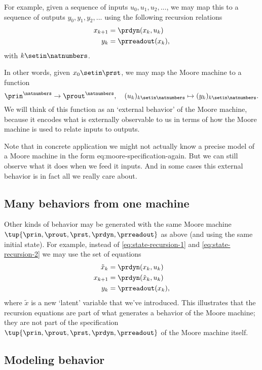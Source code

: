 For example, given a sequence of inputs $u_0, u_1, u_2, .
    .. $, we may map this to a sequence of outputs $y_0, y_1, y_2, ... $ using the following recursion relations
\begin{align}
    x_{k+1} & = \prdyn(x_k, u_k) \label{eq:state-recursion-1} \\
    y_{k}   & = \prreadout(x_{k}), \label{eq:state-recursion-2}
\end{align}
with $k \setin \natnumbers$.

In other words, given $x_0 \setin \prst$, we may map the Moore machine \label{eq:moore-again} to a function
\begin{equation}
    \prin^\natnumbers \to \prout^\natnumbers,  \quad (u_k)_{k \setin \natnumbers} \mapsto (y_k)_{k \setin \natnumbers}.
\end{equation}
We will think of this function as an `external behavior' of the Moore machine, because it encodes what is externally observable to us in terms of how the Moore machine is used to relate inputs to outputs.

Note that in concrete application we might not actually know a precise model of a Moore machine in the form {eq:moore-specification-again}.
But we can still observe what it does when we feed it inputs.
And in some cases this external behavior is in fact all we really care about.

\subsection{Many behaviors from one machine}

Other kinds of behavior may be generated with the same Moore machine $\tup{\prin, \prout, \prst, \prdyn, \prreadout}$ as above (and using the same initial state).
For example, instead of \cref{eq:state-recursion-1} and \cref{eq:state-recursion-2} we may use the set of equations
\begin{align}
    \tilde x_{k} & = \prdyn(x_k, u_k) \\
    x_{k+1}      & = \prdyn(\tilde x_{k}, u_k) \\
    y_{k}        & = \prreadout(x_{k}),
\end{align}
where $\tilde x$ is a new `latent' variable that we've introduced.
This illustrates that the recursion equations are part of what generates a behavior of the Moore machine; they are not part of the specification $\tup{\prin, \prout, \prst, \prdyn, \prreadout}$ of the Moore machine itself.

\subsection{Modeling behavior}

